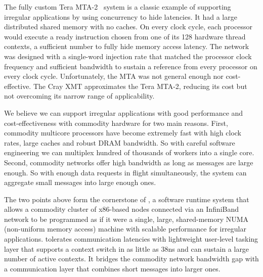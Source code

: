 The fully custom Tera MTA-2~\cite{tera:mta1} system is a classic example of
supporting irregular applications by using concurrency to hide latencies. It
had a large distributed shared memory with no caches. On every clock cycle,
each processor would execute a ready instruction chosen from one of its 128
hardware thread contexts, a sufficient number to fully hide memory access
latency. The network was designed with a single-word injection rate that
matched the processor clock frequency and sufficient bandwidth to sustain a
reference from every processor on every clock cycle. Unfortunately, the MTA
was not general enough nor cost-effective. The Cray XMT approximates the Tera
MTA-2, reducing its cost but not overcoming its narrow range of applicability.

We believe we can support irregular applications with good performance and cost-effectiveness with commodity hardware for two main reasons. First, commodity multicore processors have become extremely fast with high clock rates, large caches and robust DRAM bandwidth. So with careful software engineering we can multiplex hundred of thousands of workers into a single core. Second, commodity networks offer high bandwidth as long as messages are large enough. So with enough data requests in flight simultaneously, the system can aggregate small messages into large enough ones. 

The two points above form the cornerstone of \Grappa, a software runtime
system that allows a commodity cluster of x86-based nodes connected via an
InfiniBand network to be programmed as if it were a single, large,
shared-memory NUMA (non-uniform memory access) machine with scalable
performance for irregular applications. \Grappa tolerates communication
latencies with lightweight user-level tasking layer that supports a context
switch in as little as 38ns and can sustain a large number of active contexts.
It bridges the commodity network bandwidth gap with a communication layer that
combines short messages into larger ones.

